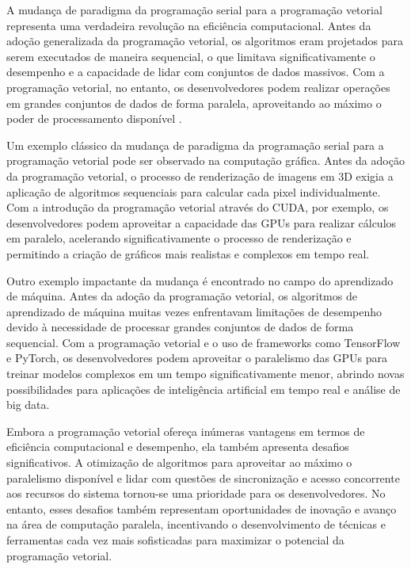 \documentclass[12pt,
openright, 
oneside, %
a4paper,    %
brazil]{facom-ufu-abntex2}
\begin{document}
A mudança de paradigma da programação serial para a programação vetorial representa uma verdadeira revolução na eficiência computacional. Antes da adoção generalizada da programação vetorial, os algoritmos eram projetados para serem executados de maneira sequencial, o que limitava significativamente o desempenho e a capacidade de lidar com conjuntos de dados massivos. Com a programação vetorial, no entanto, os desenvolvedores podem realizar operações em grandes conjuntos de dados de forma paralela, aproveitando ao máximo o poder de processamento disponível \cite{hennessy2011}.

Um exemplo clássico da mudança de paradigma da programação serial para a programação vetorial pode ser observado na computação gráfica. Antes da adoção da programação vetorial, o processo de renderização de imagens em 3D exigia a aplicação de algoritmos sequenciais para calcular cada pixel individualmente. Com a introdução da programação vetorial através do CUDA, por exemplo, os desenvolvedores podem aproveitar a capacidade das GPUs para realizar cálculos em paralelo, acelerando significativamente o processo de renderização e permitindo a criação de gráficos mais realistas e complexos em tempo real.

Outro exemplo impactante da mudança é encontrado no campo do aprendizado de máquina. Antes da adoção da programação vetorial, os algoritmos de aprendizado de máquina muitas vezes enfrentavam limitações de desempenho devido à necessidade de processar grandes conjuntos de dados de forma sequencial. Com a programação vetorial e o uso de frameworks como TensorFlow e PyTorch, os desenvolvedores podem aproveitar o paralelismo das GPUs para treinar modelos complexos em um tempo significativamente menor, abrindo novas possibilidades para aplicações de inteligência artificial em tempo real e análise de big data.

Embora a programação vetorial ofereça inúmeras vantagens em termos de eficiência computacional e desempenho, ela também apresenta desafios significativos. A otimização de algoritmos para aproveitar ao máximo o paralelismo disponível e lidar com questões de sincronização e acesso concorrente aos recursos do sistema tornou-se uma prioridade para os desenvolvedores. No entanto, esses desafios também representam oportunidades de inovação e avanço na área de computação paralela, incentivando o desenvolvimento de técnicas e ferramentas cada vez mais sofisticadas para maximizar o potencial da programação vetorial.
\end{document}
